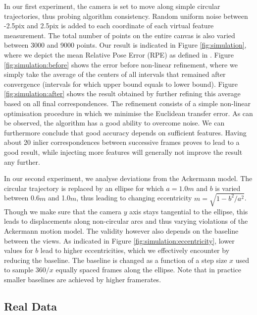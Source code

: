 \documentclass[letterpaper, 10 pt, conference]{ieeeconf}  %
\begin{document}
In our first experiment, the camera is set to move along simple circular trajectories, thus probing algorithm consistency. Random uniform noise between -2.5pix and 2.5pix is added to each coordinate of each virtual feature measurement. The total number of points on the entire canvas is also varied between 3000 and 9000 points. Our result is indicated in Figure \ref{fig:simulation}, where we depict the mean Relative Pose Error (RPE) as defined in \cite{sturm2012benchmark}. Figure \ref{fig:simulation:before} shows the error before non-linear refinement, where we simply take the average of the centers of all intervals that remained after convergence (intervals for which upper bound equals to lower bound). Figure \ref{fig:simulation:after} shows the result obtained by further refining this average based on all final correspondences. The refinement consists of a simple non-linear optimisation procedure in which we minimise the Euclidean transfer error. As can be observed, the algorithm has a good ability to overcome noise. We can furthermore conclude that good accuracy depends on sufficient features. Having about 20 inlier correspondences between successive frames proves to lead to a good result, while injecting more features will generally not improve the result any further.

In our second experiment, we analyse deviations from the Ackermann model. The circular trajectory is replaced by an ellipse for which $a = 1.0m$ and $b$ is varied between 0.6$m$ and 1.0$m$, thus leading to changing eccentricity $m = \sqrt{1 - b^2/a^2}$. Though we make sure that the camera $y$ axis stays tangential to the ellipse, this leads to displacements along non-circular arcs and thus varying violations of the Ackermann motion model. The validity however also depends on the baseline between the views. As indicated in Figure \ref{fig:simulation:eccentricity}, lower values for $b$ lead to higher eccentricities, which we effectively encounter by reducing the baseline. The baseline is changed as a function of a step size $x$ used to sample $360/x$ equally spaced frames along the ellipse. Note that in practice smaller baselines are achieved by higher framerates.

\subsection{Real Data}
\end{document}
